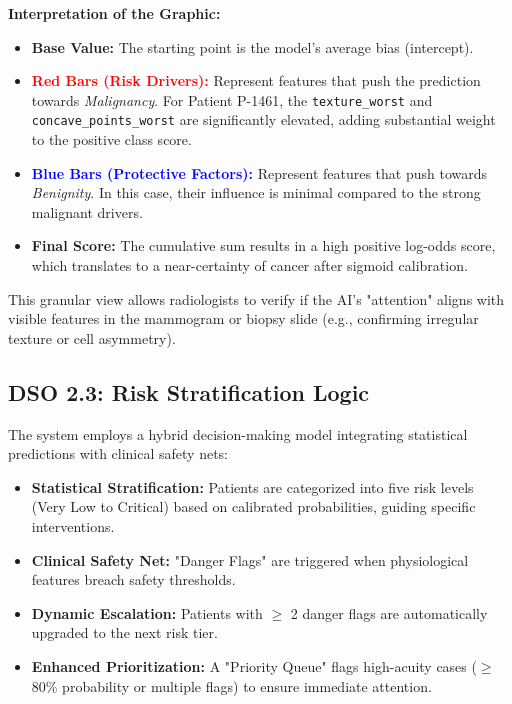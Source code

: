 \textbf{Interpretation of the Graphic:}
\begin{itemize}
    \item \textbf{Base Value:} The starting point is the model's average bias (intercept).
    \item \textbf{\textcolor{red}{Red Bars (Risk Drivers):}} Represent features that push the prediction towards \textit{Malignancy}. For Patient P-1461, the \texttt{texture\_worst} and \texttt{concave\_points\_worst} are significantly elevated, adding substantial weight to the positive class score.
    \item \textbf{\textcolor{blue}{Blue Bars (Protective Factors):}} Represent features that push towards \textit{Benignity}. In this case, their influence is minimal compared to the strong malignant drivers.
    \item \textbf{Final Score:} The cumulative sum results in a high positive log-odds score, which translates to a near-certainty of cancer after sigmoid calibration.
\end{itemize}

This granular view allows radiologists to verify if the AI's "attention" aligns with visible features in the mammogram or biopsy slide (e.g., confirming irregular texture or cell asymmetry).

\subsection{DSO 2.3: Risk Stratification Logic}
\label{sec:risk_stratification}
The system employs a hybrid decision-making model integrating statistical predictions with clinical safety nets:

\begin{itemize}
    \item \textbf{Statistical Stratification:} Patients are categorized into five risk levels (Very Low to Critical) based on calibrated probabilities, guiding specific interventions.
    \item \textbf{Clinical Safety Net:} "Danger Flags" are triggered when physiological features breach safety thresholds.
    \item \textbf{Dynamic Escalation:} Patients with $\ge$ 2 danger flags are automatically upgraded to the next risk tier.
    \item \textbf{Enhanced Prioritization:} A "Priority Queue" flags high-acuity cases ($\ge$ 80\% probability or multiple flags) to ensure immediate attention.
\end{itemize}

